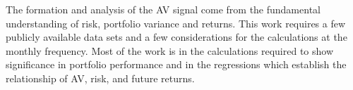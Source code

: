 The formation and analysis of the AV signal come from the fundamental understanding of risk, portfolio variance and returns. This work requires a few publicly available data sets and a few considerations for the calculations at the monthly frequency. Most of the work is in the calculations required to show significance in portfolio performance and in the regressions which establish the relationship of AV, risk, and future returns.